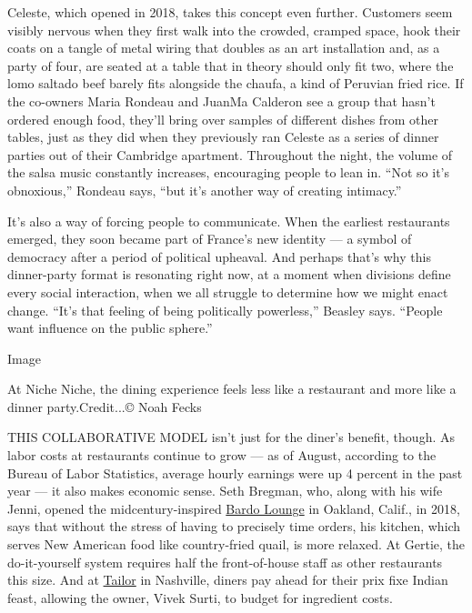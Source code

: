 Celeste, which opened in 2018, takes this concept even further.
Customers seem visibly nervous when they first walk into the crowded,
cramped space, hook their coats on a tangle of metal wiring that doubles
as an art installation and, as a party of four, are seated at a table
that in theory should only fit two, where the lomo saltado beef barely
fits alongside the chaufa, a kind of Peruvian fried rice. If the
co-owners Maria Rondeau and JuanMa Calderon see a group that hasn't
ordered enough food, they'll bring over samples of different dishes from
other tables, just as they did when they previously ran Celeste as a
series of dinner parties out of their Cambridge apartment. Throughout
the night, the volume of the salsa music constantly increases,
encouraging people to lean in. ``Not so it's obnoxious,'' Rondeau says,
``but it's another way of creating intimacy.''

It's also a way of forcing people to communicate. When the earliest
restaurants emerged, they soon became part of France's new identity ---
a symbol of democracy after a period of political upheaval. And perhaps
that's why this dinner-party format is resonating right now, at a moment
when divisions define every social interaction, when we all struggle to
determine how we might enact change. ``It's that feeling of being
politically powerless,'' Beasley says. ``People want influence on the
public sphere.''

Image

At Niche Niche, the dining experience feels less like a restaurant and
more like a dinner party.Credit...© Noah Fecks

THIS COLLABORATIVE MODEL isn't just for the diner's benefit, though. As
labor costs at restaurants continue to grow --- as of August, according
to the Bureau of Labor Statistics, average hourly earnings were up 4
percent in the past year --- it also makes economic sense. Seth Bregman,
who, along with his wife Jenni, opened the midcentury-inspired
\href{https://www.bardooakland.com/}{Bardo Lounge} in Oakland, Calif.,
in 2018, says that without the stress of having to precisely time
orders, his kitchen, which serves New American food like country-fried
quail, is more relaxed. At Gertie, the do-it-yourself system requires
half the front-of-house staff as other restaurants this size. And at
\href{https://www.tailornashville.com/}{Tailor} in Nashville, diners pay
ahead for their prix fixe Indian feast, allowing the owner, Vivek Surti,
to budget for ingredient costs.

